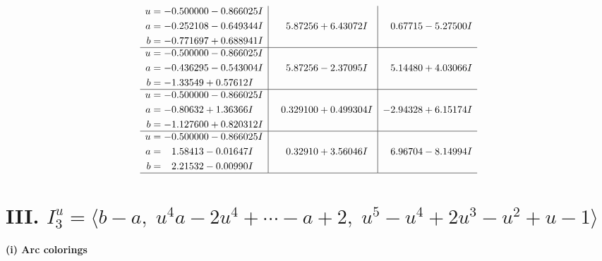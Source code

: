 \documentclass[1p]{elsarticle_modified}
\theoremstyle{definition}
\begin{document}
$$\begin{array}{c|c|c}
\begin{aligned}
u &= -0.500000 - 0.866025 I \\
a &= -0.252108 - 0.649344 I \\
b &= -0.771697 + 0.688941 I\end{aligned}
 & \phantom{-}5.87256 + 6.43072 I & \phantom{-}0.67715 - 5.27500 I \\ \hline\begin{aligned}
u &= -0.500000 - 0.866025 I \\
a &= -0.436295 - 0.543004 I \\
b &= -1.33549 + 0.57612 I\end{aligned}
 & \phantom{-}5.87256 - 2.37095 I & \phantom{-}5.14480 + 4.03066 I \\ \hline\begin{aligned}
u &= -0.500000 - 0.866025 I \\
a &= -0.80632 + 1.36366 I \\
b &= -1.127600 + 0.820312 I\end{aligned}
 & \phantom{-}0.329100 + 0.499304 I & -2.94328 + 6.15174 I \\ \hline\begin{aligned}
u &= -0.500000 - 0.866025 I \\
a &= \phantom{-}1.58413 - 0.01647 I \\
b &= \phantom{-}2.21532 - 0.00990 I\end{aligned}
 & \phantom{-}0.32910 + 3.56046 I & \phantom{-}6.96704 - 8.14994 I\\
 \hline 
 \end{array}$$\newpage\newpage\renewcommand{\arraystretch}{1}
\centering \section*{III. $I^u_{3}= \langle b- a,\;u^4 a-2 u^4+\cdots- a+2,\;u^5- u^4+2 u^3- u^2+u-1 \rangle$}
\flushleft \textbf{(i) Arc colorings}\\
\end{document}
